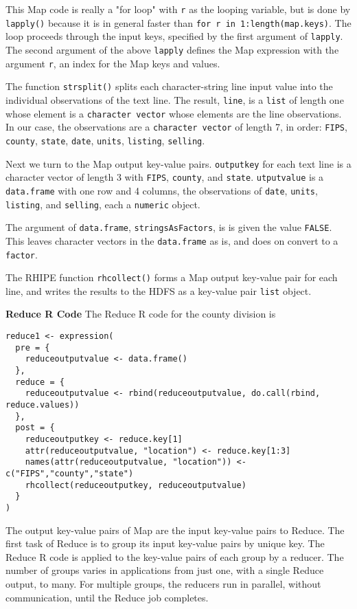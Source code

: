 This Map code is really a "for loop" with \texttt{r} as the looping variable,
but is done by \texttt{lapply()} because it is
in general faster than \texttt{for r in 1:length(map.keys)}.
The loop proceeds through the input keys, specified by the first argument of
\texttt{lapply}.  The second argument of the above \texttt{lapply} defines the Map expression
with the argument \texttt{r}, an index for the Map keys and values.

The function \texttt{strsplit()} splits each character-string line input value
into the individual observations of the text line. The result, \texttt{line},
is a \texttt{list} of length one whose element is a \texttt{character vector} whose elements
are the line observations. In our case, the
observations are a \texttt{character vector} of length 7, in order:
\texttt{FIPS}, \texttt{county}, \texttt{state}, \texttt{date}, \texttt{units}, \texttt{listing}, 
\texttt{selling}.

Next we turn to the Map output key-value pairs.
\texttt{outputkey} for each text line is a character vector of length 3 with \texttt{FIPS},
\texttt{county}, and \texttt{state}. \texttt{utputvalue} is a \texttt{data.frame} with one row
and 4 columns, the observations of \texttt{date}, \texttt{units}, \texttt{listing}, and 
\texttt{selling}, each a \texttt{numeric} object.

The argument of \texttt{data.frame}, \texttt{stringsAsFactors}, is
is given the value \texttt{FALSE}. This leaves character vectors in the \texttt{data.frame}
as is, and does on convert to a \texttt{factor}.

The RHIPE function \texttt{rhcollect()} forms a Map output key-value pair for each
line, and writes the results to the HDFS as a key-value pair \texttt{list} object.

\textbf{Reduce R Code}
The Reduce R code for the county division is

\begin{verbatim}
reduce1 <- expression(
  pre = {
    reduceoutputvalue <- data.frame()
  },
  reduce = {
    reduceoutputvalue <- rbind(reduceoutputvalue, do.call(rbind, reduce.values))
  },
  post = {
    reduceoutputkey <- reduce.key[1]
    attr(reduceoutputvalue, "location") <- reduce.key[1:3]
    names(attr(reduceoutputvalue, "location")) <- c("FIPS","county","state")
    rhcollect(reduceoutputkey, reduceoutputvalue)
  }
)
\end{verbatim}

The output key-value pairs of Map are the input key-value pairs to Reduce.
The first task of Reduce is to group its input key-value pairs by unique key.
The Reduce R code is applied to the key-value pairs of each group by a
reducer. The number of groups varies in applications from just one, with a
single Reduce output, to many.
For multiple groups, the reducers run in parallel, without communication,
until the Reduce job completes.

